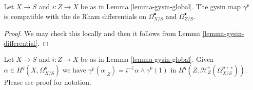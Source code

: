 \begin{lemma}
\label{lemma-gysin-differential-global}
Let $X \to S$ and $i : Z \to X$ be as in Lemma \ref{lemma-gysin-global}.
The gysin map $\gamma^p$ is compatible with the de Rham
differentials on $\Omega^\bullet_{X/S}$ and $\Omega^\bullet_{Z/S}$.
\end{lemma}

\begin{proof}
We may check this locally and then it follows from
Lemma \ref{lemma-gysin-differential}.
\end{proof}

\begin{lemma}
\label{lemma-gysin-projection}
Let $X \to S$ and $i : Z \to X$ be as in Lemma \ref{lemma-gysin-global}.
Given $\alpha \in H^q(X, \Omega^p_{X/S})$ we have
$\gamma^p(\alpha|_Z) = i^{-1}\alpha \wedge \gamma^0(1)$ in
$H^q(Z, \mathcal{H}^c_Z(\Omega^{p + c}_{X/S}))$.
Please see proof for notation.
\end{lemma}


